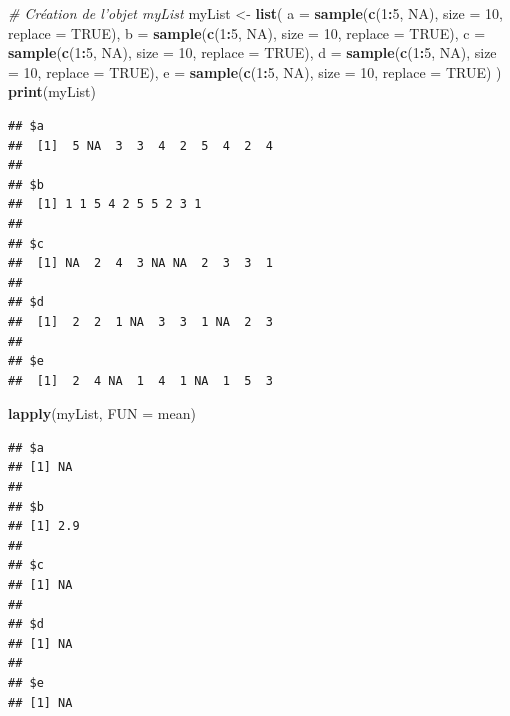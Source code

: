 \documentclass[
]{book}
\newenvironment{Shaded}{\begin{snugshade}}{\end{snugshade}}
\newcommand{\CommentTok}[1]{\textcolor[rgb]{0.56,0.35,0.01}{\textit{#1}}}
\newcommand{\DataTypeTok}[1]{\textcolor[rgb]{0.13,0.29,0.53}{#1}}
\newcommand{\DecValTok}[1]{\textcolor[rgb]{0.00,0.00,0.81}{#1}}
\newcommand{\KeywordTok}[1]{\textcolor[rgb]{0.13,0.29,0.53}{\textbf{#1}}}
\newcommand{\NormalTok}[1]{#1}
\newcommand{\OperatorTok}[1]{\textcolor[rgb]{0.81,0.36,0.00}{\textbf{#1}}}
\newcommand{\OtherTok}[1]{\textcolor[rgb]{0.56,0.35,0.01}{#1}}
\newcommand{\StringTok}[1]{\textcolor[rgb]{0.31,0.60,0.02}{#1}}
\begin{document}
\begin{Shaded}
\begin{Highlighting}[]
\CommentTok{# Création de l'objet myList}
\NormalTok{myList <-}\StringTok{ }\KeywordTok{list}\NormalTok{(}
  \DataTypeTok{a =} \KeywordTok{sample}\NormalTok{(}\KeywordTok{c}\NormalTok{(}\DecValTok{1}\OperatorTok{:}\DecValTok{5}\NormalTok{, }\OtherTok{NA}\NormalTok{), }\DataTypeTok{size =} \DecValTok{10}\NormalTok{, }\DataTypeTok{replace =} \OtherTok{TRUE}\NormalTok{), }
  \DataTypeTok{b =} \KeywordTok{sample}\NormalTok{(}\KeywordTok{c}\NormalTok{(}\DecValTok{1}\OperatorTok{:}\DecValTok{5}\NormalTok{, }\OtherTok{NA}\NormalTok{), }\DataTypeTok{size =} \DecValTok{10}\NormalTok{, }\DataTypeTok{replace =} \OtherTok{TRUE}\NormalTok{), }
  \DataTypeTok{c =} \KeywordTok{sample}\NormalTok{(}\KeywordTok{c}\NormalTok{(}\DecValTok{1}\OperatorTok{:}\DecValTok{5}\NormalTok{, }\OtherTok{NA}\NormalTok{), }\DataTypeTok{size =} \DecValTok{10}\NormalTok{, }\DataTypeTok{replace =} \OtherTok{TRUE}\NormalTok{), }
  \DataTypeTok{d =} \KeywordTok{sample}\NormalTok{(}\KeywordTok{c}\NormalTok{(}\DecValTok{1}\OperatorTok{:}\DecValTok{5}\NormalTok{, }\OtherTok{NA}\NormalTok{), }\DataTypeTok{size =} \DecValTok{10}\NormalTok{, }\DataTypeTok{replace =} \OtherTok{TRUE}\NormalTok{), }
  \DataTypeTok{e =} \KeywordTok{sample}\NormalTok{(}\KeywordTok{c}\NormalTok{(}\DecValTok{1}\OperatorTok{:}\DecValTok{5}\NormalTok{, }\OtherTok{NA}\NormalTok{), }\DataTypeTok{size =} \DecValTok{10}\NormalTok{, }\DataTypeTok{replace =} \OtherTok{TRUE}\NormalTok{)}
\NormalTok{)}
\KeywordTok{print}\NormalTok{(myList)}
\end{Highlighting}
\end{Shaded}

\begin{verbatim}
## $a
##  [1]  5 NA  3  3  4  2  5  4  2  4
## 
## $b
##  [1] 1 1 5 4 2 5 5 2 3 1
## 
## $c
##  [1] NA  2  4  3 NA NA  2  3  3  1
## 
## $d
##  [1]  2  2  1 NA  3  3  1 NA  2  3
## 
## $e
##  [1]  2  4 NA  1  4  1 NA  1  5  3
\end{verbatim}

\begin{Shaded}
\begin{Highlighting}[]
\KeywordTok{lapply}\NormalTok{(myList, }\DataTypeTok{FUN =}\NormalTok{ mean)}
\end{Highlighting}
\end{Shaded}

\begin{verbatim}
## $a
## [1] NA
## 
## $b
## [1] 2.9
## 
## $c
## [1] NA
## 
## $d
## [1] NA
## 
## $e
## [1] NA
\end{verbatim}
\end{document}
